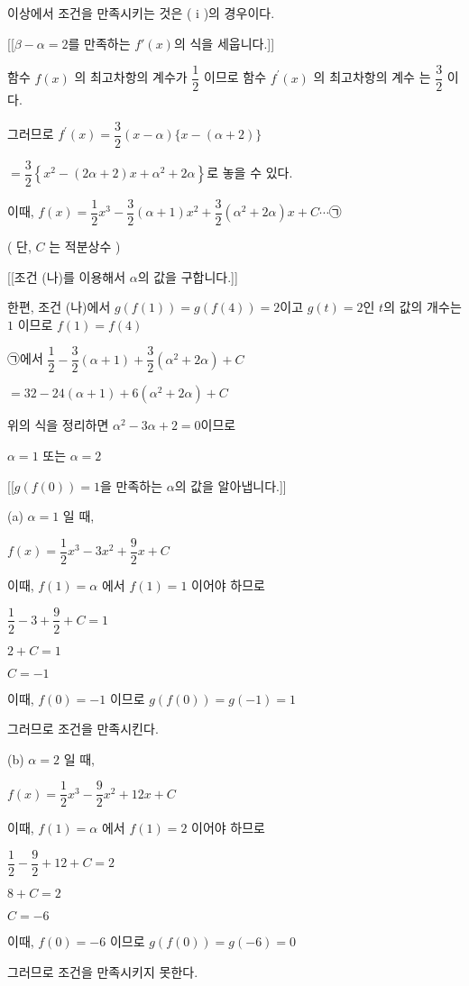 \documentclass{oblivoir}
\begin{document}
이상에서 조건을 만족시키는 것은 ( i )의 경우이다.

[[$\beta-\alpha=2$를 만족하는 $f'(x)$의 식을 세웁니다.]]

함수 $f(x)$ 의 최고차항의 계수가 $\dfrac{1}{2}$ 이므로 함수 $f^{\prime}(x)$ 의 최고차항의 계수
는 $\dfrac{3}{2}$ 이다.

그러므로
$f^{\prime}(x)=\dfrac{3}{2}(x-\alpha)\{x-(\alpha+2)\}$

$=\dfrac{3}{2}\left\{x^{2}-(2 \alpha+2) x+\alpha^{2}+2 \alpha\right\}$로 놓을 수 있다.

이때,
$f(x)=\dfrac{1}{2} x^{3}-\dfrac{3}{2}(\alpha+1) x^{2}+\dfrac{3}{2}\left(\alpha^{2}+2 \alpha\right) x+C \cdots $㉠

( 단, $C$ 는 적분상수 )

[[조건 (나)를 이용해서 $\alpha$의 값을 구합니다.]]

한편, 조건 (나)에서 $g(f(1))=g(f(4))=2$이고 $g(t)=2$인 $t$의 값의 개수는 $1$ 이므로 $f(1)=f(4)$

㉠에서
$\dfrac{1}{2}-\dfrac{3}{2}(\alpha+1)+\dfrac{3}{2}\left(\alpha^{2}+2 \alpha\right)+C$

$=32-24(\alpha+1)+6\left(\alpha^{2}+2 \alpha\right)+C$

위의 식을 정리하면 $\alpha^{2}-3 \alpha+2=0$이므로

$\alpha=1$ 또는 $\alpha=2$

[[$g(f(0))=1$을 만족하는 $\alpha$의 값을 알아냅니다.]]

(a) $\alpha=1$ 일 때,

$f(x)=\dfrac{1}{2} x^{3}-3 x^{2}+\dfrac{9}{2} x+C$

이때, $f(1)=\alpha$ 에서 $f(1)=1$ 이어야 하므로

$\dfrac{1}{2}-3+\dfrac{9}{2}+C=1$

$2+C=1$

$C=-1$

이때, $f(0)=-1$ 이므로 $g(f(0))=g(-1)=1$

그러므로 조건을 만족시킨다.

(b) $\alpha=2$ 일 때,

$f(x)=\dfrac{1}{2} x^{3}-\dfrac{9}{2} x^{2}+12 x+C$

이때, $f(1)=\alpha$ 에서 $f(1)=2$ 이어야 하므로

$\dfrac{1}{2}-\dfrac{9}{2}+12+C=2$

$8+C=2$

$C=-6$

이때, $f(0)=-6$ 이므로 $g(f(0))=g(-6)=0$

그러므로 조건을 만족시키지 못한다.
\end{document}
